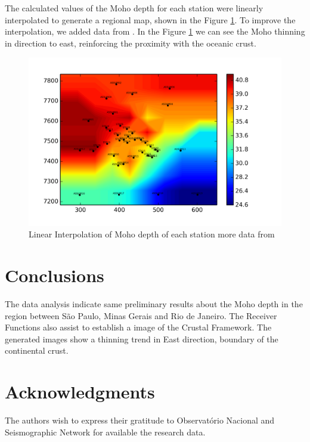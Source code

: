 \documentclass[twoside,letterpaper,twocolumn]{article}
\begin{document}
The calculated values of the Moho depth for each station were linearly interpolated to generate a regional map, shown in the Figure \ref{figura7}. To improve the interpolation, we added data from \citep{assumpcao_crustal_2013}. In the Figure \ref{figura7} we can see the Moho thinning in direction to east, reinforcing the proximity with the oceanic crust.

\begin{figure}[!ht]
\centering
\includegraphics[scale=0.1]{Interpolacao_Linear.png} \caption{Linear Interpolation of Moho depth of each station more data from \citep{assumpcao_crustal_2013}} 
\label{figura7}
\end{figure}



\section{Conclusions}

The data analysis indicate same preliminary results about the Moho depth in the region between S\~{a}o Paulo, Minas Gerais and Rio de Janeiro. The Receiver Functions also assist to establish a image of the Crustal Framework. The generated images show a thinning trend in East direction, boundary of the continental crust.

  



\section{Acknowledgments}

The authors wish to express their gratitude to Observat\'{o}rio Nacional and Seismographic Network for available the research data.
\end{document}
